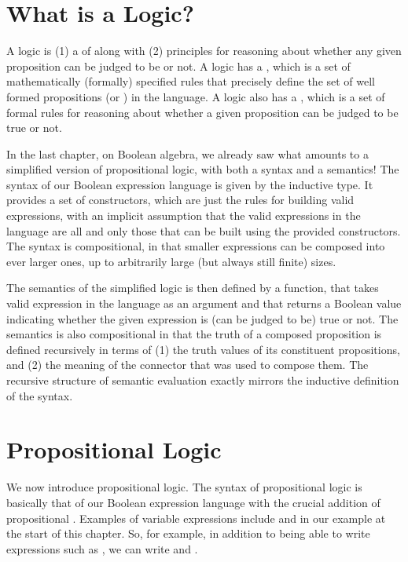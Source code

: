 \documentclass[letterpaper,10pt,english]{sphinxmanual}
\begin{document}
\section{What is a Logic?}
\label{\detokenize{09-propositional-logic:what-is-a-logic}}
A logic is (1) a  of  along with (2)
principles for reasoning about whether any given proposition can be
judged to be  or not. A logic has a , which is a set of
mathematically (formally) specified rules that precisely define the
set of well formed propositions (or )
in the language. A logic also has a , which is a set of
formal rules for reasoning about whether a given proposition can be
judged to be true or not.

In the last chapter, on Boolean algebra, we already saw what amounts
to a simplified version of propositional logic, with both a syntax and
a semantics! The syntax of our Boolean expression language is given by
the inductive  type.  It provides a set of constructors, which
are just the rules for building valid expressions, with an implicit
assumption that the valid expressions in the language are all and only
those that can be built using the provided constructors. The syntax is
compositional, in that smaller expressions can be composed into ever
larger ones, up to arbitrarily large (but always still finite) sizes.

The semantics of the simplified logic is then defined by a  function, that takes  valid expression in the
language as an argument and that returns a Boolean value indicating
whether the given expression is (can be judged to be) true or not.
The semantics is also compositional in that the truth of a composed
proposition is defined recursively in terms of (1) the truth values of
its constituent propositions, and (2) the meaning of the connector
that was used to compose them. The recursive structure of semantic
evaluation exactly mirrors the inductive definition of the syntax.


\section{Propositional Logic}
\label{\detokenize{09-propositional-logic:id1}}
We now introduce propositional logic. The syntax of propositional
logic is basically that of our Boolean expression language with the
crucial addition of propositional . Examples of
variable expressions include  and  in our example at the start
of this chapter. So, for example, in addition to being able to write
expressions such as , we can write 
and .
\end{document}
